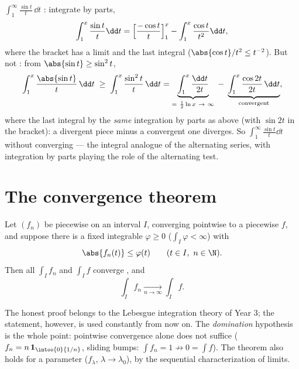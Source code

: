 \begin{example}\label{ex:b2:integration:sint}
$\displaystyle\int_1^{\infty} \frac{\sin t}{t}\,\dd t$ :
integrate by parts,
\[
\int_1^x \frac{\sin t}{t}\dd t
= \Bigl[\frac{-\cos t}{t}\Bigr]_1^x - \int_1^x \frac{\cos
t}{t^2}\dd t ,
\]
where the bracket has a limit and the last integral 
 ($\abs{\cos t}/t^2 \leq t^{-2}$). But not :
from $\abs{\sin t} \geq \sin^2 t$,
\[
\int_1^x \frac{\abs{\sin t}}{t}\,\dd t
\;\geq\; \int_1^x \frac{\sin^2t}{t}\,\dd t
= \underbrace{\int_1^x \frac{\dd t}{2t}}_{=\ \frac12\ln x
\ \to\ \infty}
\;-\; \underbrace{\int_1^x \frac{\cos 2t}{2t}\,\dd
t}_{\text{convergent}} ,
\]
where the last integral  by the \emph{same}
integration by parts as above (with $\sin 2t$ in the bracket):
a divergent piece minus a convergent one diverges. So
$\int_1^\infty\frac{\sin t}{t}\dd t$  without
converging  --- the integral analogue of the
alternating series, with integration by parts playing the role
of the alternating test.
\end{example}

\section{The convergence theorem}

\begin{theorem}\label{thm:b2:integration:dominated}
Let $(f_n)$ be piecewise  on an interval $I$, converging
pointwise to a piecewise  $f$, and suppose there is a
fixed integrable $\varphi \geq 0$ ($\int_I \varphi < \infty$)
with
\[
\abs{f_n(t)} \leq \varphi(t) \qquad (t \in I,\ n \in \N).
\]
Then all $\int_I f_n$ and $\int_I f$ converge , and
\[
\int_I f_n \xrightarrow[n \to \infty]{} \int_I f .
\]
\end{theorem}
\admitted

\begin{remark}
The honest proof belongs to the Lebesgue integration theory of Year
3; the statement, however, is used constantly from now on. The
\emph{domination} hypothesis is the whole point: pointwise
convergence alone does not suffice ($f_n = n\,\mathbf{1}_{\intoo{0}{1/n}}$,
sliding bumps: $\int f_n = 1 \not\to 0 = \int f$). The theorem
also holds for a  parameter ($f_\lambda$, $\lambda \to
\lambda_0$), by the sequential characterization of limits.
\end{remark}

